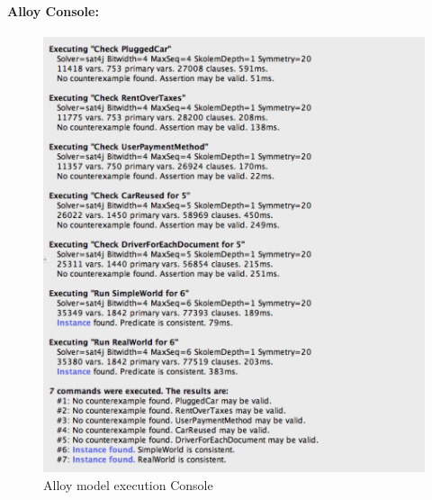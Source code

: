 \paragraph{Alloy Console:}
\begin{figure}[H]
   \begin{center}
    \includegraphics[width=\textwidth]{Resources/alloyConsole.png}
    \caption{Alloy model execution Console}
   \end{center}
    \label{fig:mdlConsole}
\end{figure}
